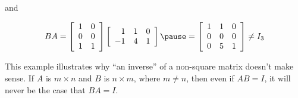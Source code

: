 \documentclass[pdf
,handout
]{beamer}
\begin{document}
{{{{\begin{example}
and
\vspace*{-.2in}

\[ BA= 
\left[\begin{array}{rr}
1 & 0 \\ 0 & 0 \\ 1 & 1 \end{array}\right]
\left[\begin{array}{rrr}
1 & 1 & 0 \\ -1 & 4 & 1 \end{array}\right]
\pause
= \left[ \begin{array}{rrr}
1 & 1 & 0 \\
0 & 0 & 0 \\
0 & 5 & 1
\end{array} \right] \neq I_3 \]
\end{example}
\pause
\begin{alertblock}{}
This example illustrates why ``an inverse'' of a non-square matrix
doesn't make sense.
If $A$ is $m\times n$ and $B$ is $n\times m$, where $m\neq n$,
then even if $AB=I$, it will never be the case that $BA=I$.
\end{alertblock}
}}

}}
\end{document}
